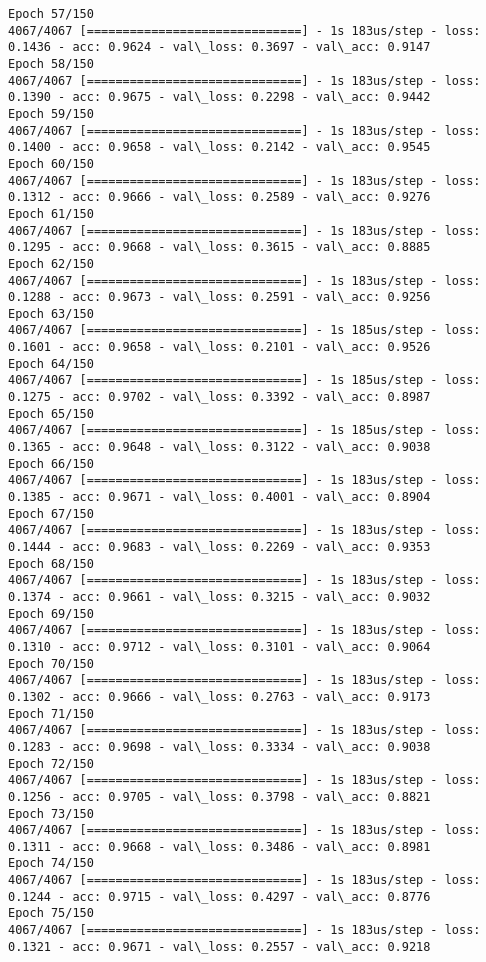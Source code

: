 \documentclass[11pt]{article}
\begin{document}
\begin{Verbatim}[commandchars=\\\{\}]
Epoch 57/150
4067/4067 [==============================] - 1s 183us/step - loss: 0.1436 - acc: 0.9624 - val\_loss: 0.3697 - val\_acc: 0.9147
Epoch 58/150
4067/4067 [==============================] - 1s 183us/step - loss: 0.1390 - acc: 0.9675 - val\_loss: 0.2298 - val\_acc: 0.9442
Epoch 59/150
4067/4067 [==============================] - 1s 183us/step - loss: 0.1400 - acc: 0.9658 - val\_loss: 0.2142 - val\_acc: 0.9545
Epoch 60/150
4067/4067 [==============================] - 1s 183us/step - loss: 0.1312 - acc: 0.9666 - val\_loss: 0.2589 - val\_acc: 0.9276
Epoch 61/150
4067/4067 [==============================] - 1s 183us/step - loss: 0.1295 - acc: 0.9668 - val\_loss: 0.3615 - val\_acc: 0.8885
Epoch 62/150
4067/4067 [==============================] - 1s 183us/step - loss: 0.1288 - acc: 0.9673 - val\_loss: 0.2591 - val\_acc: 0.9256
Epoch 63/150
4067/4067 [==============================] - 1s 185us/step - loss: 0.1601 - acc: 0.9658 - val\_loss: 0.2101 - val\_acc: 0.9526
Epoch 64/150
4067/4067 [==============================] - 1s 185us/step - loss: 0.1275 - acc: 0.9702 - val\_loss: 0.3392 - val\_acc: 0.8987
Epoch 65/150
4067/4067 [==============================] - 1s 185us/step - loss: 0.1365 - acc: 0.9648 - val\_loss: 0.3122 - val\_acc: 0.9038
Epoch 66/150
4067/4067 [==============================] - 1s 183us/step - loss: 0.1385 - acc: 0.9671 - val\_loss: 0.4001 - val\_acc: 0.8904
Epoch 67/150
4067/4067 [==============================] - 1s 183us/step - loss: 0.1444 - acc: 0.9683 - val\_loss: 0.2269 - val\_acc: 0.9353
Epoch 68/150
4067/4067 [==============================] - 1s 183us/step - loss: 0.1374 - acc: 0.9661 - val\_loss: 0.3215 - val\_acc: 0.9032
Epoch 69/150
4067/4067 [==============================] - 1s 183us/step - loss: 0.1310 - acc: 0.9712 - val\_loss: 0.3101 - val\_acc: 0.9064
Epoch 70/150
4067/4067 [==============================] - 1s 183us/step - loss: 0.1302 - acc: 0.9666 - val\_loss: 0.2763 - val\_acc: 0.9173
Epoch 71/150
4067/4067 [==============================] - 1s 183us/step - loss: 0.1283 - acc: 0.9698 - val\_loss: 0.3334 - val\_acc: 0.9038
Epoch 72/150
4067/4067 [==============================] - 1s 183us/step - loss: 0.1256 - acc: 0.9705 - val\_loss: 0.3798 - val\_acc: 0.8821
Epoch 73/150
4067/4067 [==============================] - 1s 183us/step - loss: 0.1311 - acc: 0.9668 - val\_loss: 0.3486 - val\_acc: 0.8981
Epoch 74/150
4067/4067 [==============================] - 1s 183us/step - loss: 0.1244 - acc: 0.9715 - val\_loss: 0.4297 - val\_acc: 0.8776
Epoch 75/150
4067/4067 [==============================] - 1s 183us/step - loss: 0.1321 - acc: 0.9671 - val\_loss: 0.2557 - val\_acc: 0.9218

\end{Verbatim}
\end{document}
